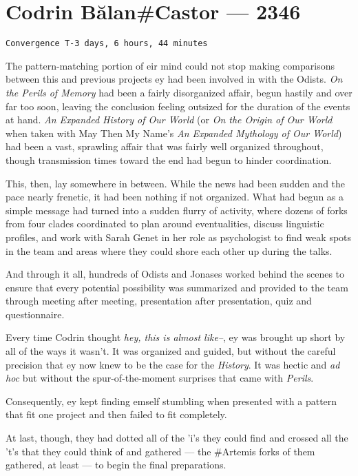 \hypertarget{codrin-bux103lancastor-2346}{%
\chapter{Codrin Bălan\#Castor — 2346}\label{codrin-bux103lancastor-2346}}

\begin{verbatim}
Convergence T-3 days, 6 hours, 44 minutes
\end{verbatim}

The pattern-matching portion of eir mind could not stop making comparisons between this and previous projects ey had been involved in with the Odists. \emph{On the Perils of Memory} had been a fairly disorganized affair, begun hastily and over far too soon, leaving the conclusion feeling outsized for the duration of the events at hand. \emph{An Expanded History of Our World} (or \emph{On the Origin of Our World} when taken with May Then My Name's \emph{An Expanded Mythology of Our World}) had been a vast, sprawling affair that was fairly well organized throughout, though transmission times toward the end had begun to hinder coordination.

This, then, lay somewhere in between. While the news had been sudden and the pace nearly frenetic, it had been nothing if not organized. What had begun as a simple message had turned into a sudden flurry of activity, where dozens of forks from four clades coordinated to plan around eventualities, discuss linguistic profiles, and work with Sarah Genet in her role as psychologist to find weak spots in the team and areas where they could shore each other up during the talks.

And through it all, hundreds of Odists and Jonases worked behind the scenes to ensure that every potential possibility was summarized and provided to the team through meeting after meeting, presentation after presentation, quiz and questionnaire.

Every time Codrin thought \emph{hey, this is almost like--}, ey was brought up short by all of the ways it wasn't. It was organized and guided, but without the careful precision that ey now knew to be the case for the \emph{History}. It was hectic and \emph{ad hoc} but without the spur-of-the-moment surprises that came with \emph{Perils}.

Consequently, ey kept finding emself stumbling when presented with a pattern that fit one project and then failed to fit completely.

At last, though, they had dotted all of the 'i's they could find and crossed all the 't's that they could think of and gathered — the \#Artemis forks of them gathered, at least — to begin the final preparations.

